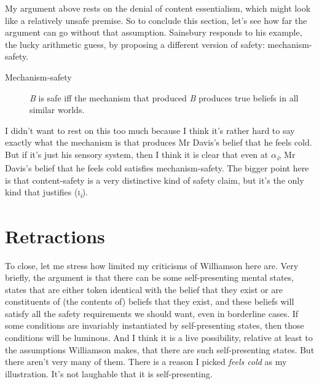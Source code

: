 My argument above rests on the denial of content essentialism, which might look like a relatively unsafe premise. So to conclude this section, let's see how far the argument can go without that assumption. Sainsbury responds to his example, the lucky arithmetic guess, by proposing a different version of safety: mechanism-safety.

\begin{description}
\item[Mechanism-safety] \textit{B} is safe iff the mechanism that produced \textit{B} produces true beliefs in all similar worlds.
\end{description}

\noindent I didn't want to rest on this too much because I think it's rather hard to say exactly what the mechanism is that produces Mr Davis's belief that he feels cold. But if it's just his sensory system, then I think it is clear that even at ${\alpha}$\textit{\textsubscript{i}}, Mr Davis's belief that he feels cold satisfies mechanism-safety. The bigger point here is that content-safety is a very distinctive kind of safety claim, but it's the only kind that justifies (\textsc{i}\textit{\textsubscript{i}}).

\section{Retractions}

To close, let me stress how limited my criticisms of Williamson here are. Very briefly, the argument is that there can be some self-presenting mental states, states that are either token identical with the belief that they exist or are constituents of (the contents of) beliefs that they exist, and these beliefs will satisfy all the safety requirements we should want, even in borderline cases. If some conditions are invariably instantiated by self-presenting states, then those conditions will be luminous. And I think it is a live possibility, relative at least to the assumptions Williamson makes, that there are such self-presenting states. But there aren't very many of them. There is a reason I picked \textit{feels cold} as my illustration. It's not laughable that it is self-presenting. 

